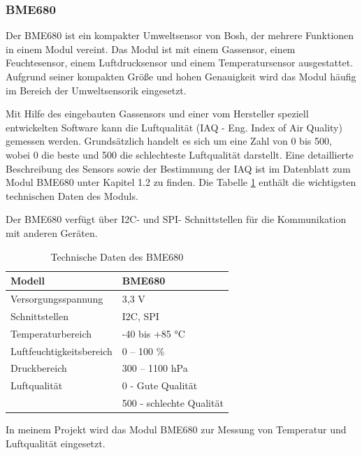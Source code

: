 \documentclass[12pt, letterpaper]{article}
\begin{document}
  \subsubsection{BME680}
  \par Der BME680 ist ein kompakter Umweltsensor von Bosh, der mehrere Funktionen in einem Modul vereint. Das Modul ist mit einem Gassensor, einem Feuchtesensor, einem Luftdrucksensor und einem Temperatursensor ausgestattet. Aufgrund seiner kompakten Größe und hohen Genauigkeit wird das Modul häufig im Bereich der Umweltsensorik eingesetzt.
  \par Mit Hilfe des eingebauten Gassensors und einer vom Hersteller speziell entwickelten Software kann die Luftqualität (IAQ - Eng. Index of Air Quality) gemessen werden. Grundsätzlich handelt es sich um eine Zahl von 0 bis 500, wobei 0 die beste und 500 die schlechteste Luftqualität darstellt. Eine detaillierte Beschreibung des Sensors sowie der Bestimmung der IAQ ist im Datenblatt zum Modul BME680 \cite{bme680} unter Kapitel 1.2 zu finden. Die Tabelle \ref{tab:bme680td} enthält die wichtigsten technischen Daten des Moduls.
  \par Der BME680 verfügt über I2C- und SPI- Schnittstellen für die Kommunikation mit anderen Geräten. 
  \begin{table}[h]
    \centering
    \begin{tabular}{|l|l|}
    \hline
    Modell & BME680 \\ \hline
    Versorgungsspannung & 3,3 V \\ \hline
    Schnittstellen & I2C, SPI \\ \hline
    Temperaturbereich & -40 bis +85 °C \\ \hline
    Luftfeuchtigkeitsbereich & 0 – 100 \% \\ \hline
    Druckbereich & 300 – 1100 hPa \\ \hline
    Luftqualität & 0 - Gute Qualität \\ & 500 - schlechte Qualität \\ \hline
    \end{tabular}
    \caption{Technische Daten des BME680}
    \label{tab:bme680td}
    \end{table}
  \par In meinem Projekt wird das Modul BME680 zur Messung von Temperatur und Luftqualität eingesetzt.
\end{document}
